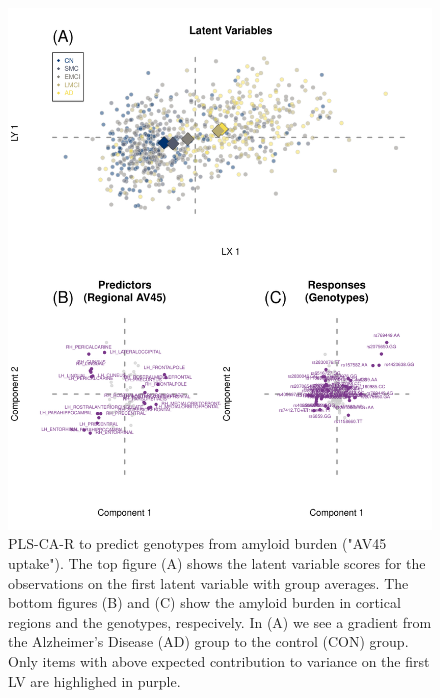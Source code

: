 \documentclass[12pt]{article}
\begin{document}
\begin{figure}[!hbtp]

{\centering \includegraphics[width=.8\textwidth,height=.8\textheight]{PLSCAR_to_a_GPLS_files/figure-latex/unnamed-chunk-13-1} 

}

\caption{\label{fig:brain_genotypes_ex2} PLS-CA-R to predict genotypes from amyloid burden ("AV45 uptake"). The top figure (A) shows the latent variable scores for the observations on the first latent variable with group averages. The bottom figures (B) and (C) show the amyloid burden in cortical regions and the genotypes, respecively. In (A) we see a gradient from the Alzheimer's Disease (AD) group to the control (CON) group. Only items with above expected contribution to variance on the first LV are highlighed in purple.}\label{fig:unnamed-chunk-13}
\end{figure}
\end{document}
